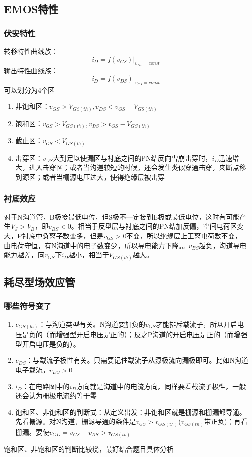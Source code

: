 \documentclass{ctexart}
\begin{document}
\subsection{EMOS特性}
\subsubsection{伏安特性}
转移特性曲线族：
\begin{equation}
    i_D=f(v_{GS})|_{v_{DS}=const}
\end{equation}
输出特性曲线族：
\begin{equation}
    i_D=f(v_{DS})|_{v_{GS}=const}
\end{equation}
可以划分为4个区
\begin{enumerate}
    \item 非饱和区：$v_{GS}>V_{GS(th)},v_{DS}<v_{GS}-V_{GS(th)}$
    \item 饱和区：$v_{GS}>V_{GS(th)},v_{DS}>v_{GS}-V_{GS(th)}$
    \item 截止区：$v_{GS}<V_{GS(th)}$
    \item 击穿区：$v_{DS}$大到足以使漏区与衬底之间的PN结反向雪崩击穿时，$i_D$迅速增大，进入击穿区；或者当沟道较短的时候，还会发生类似穿通击穿，夹断点移到源区；或者当栅源电压过大，使得绝缘层被击穿
\end{enumerate}
\subsubsection{衬底效应}
对于N沟道管，B极接最低电位，但S极不一定接到B极或最低电位，这时有可能产生$V_S>V_B$，即$v_{BS}<0$。相当于反型层与衬底之间的PN结加反偏，空间电荷区变大，P衬底中负离子数变多，但是$v_{GS}>0$不变，所以绝缘层上正离电荷数不变，由电荷守恒，有N沟道中的电子数变少，所以导电能力下降。。$v_{BS}$越负，沟道导电能力越差，同$v_{GS}$下$i_D$越小，相当于$V_{GS(th)}$越大。
\subsection{耗尽型场效应管}
\subsubsection{哪些符号变了}
\begin{enumerate}
    \item $v_{GS(th)}$：与沟道类型有关。N沟道要加负的$v_{GS}$才能排斥载流子，所以开启电压是负的（而增强型开启电压是正的）；反之P沟道的开启电压是正的（而增强型开启电压是负的）。
    \item $v_{DS}$：与载流子极性有关。只需要记住载流子从源极流向漏极即可。比如N沟道电子载流，$v_{DS}>0$
    \item $i_D$：在电路图中的$i_D$方向就是沟道中的电流方向，同样要看载流子极性，一般还会认为栅极电流约等于零
    \item 饱和区、非饱和区的判断式：从定义出发：非饱和区就是栅源和栅漏都导通。先看栅源。对N沟道，栅源导通的条件是$v_{GS}>v_{GS(th)}$($v_{GS(th)}$带正负)；再看栅漏。要使$v_{GD}=v_{GS}-v_{DS}>v_{GS(th)}$
\end{enumerate}
{\color{Red}饱和区、非饱和区的判断比较绕，最好结合题目具体分析}
\end{document}
